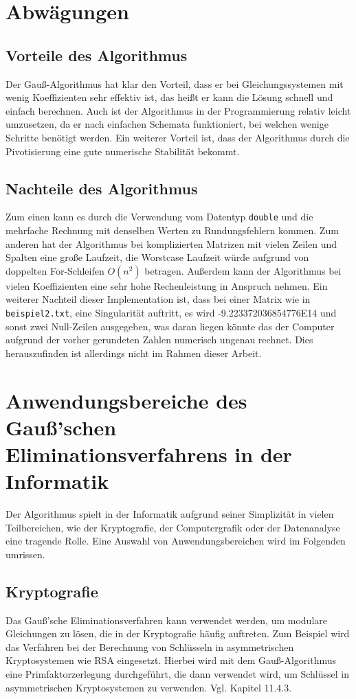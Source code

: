 \documentclass[a4paper, 12pt]{report}
\newcommand{\GA}{Gauß-Algorithmus }
\begin{document}
{\let\clearpage\relax \chapter{Abwägungen}}
\section{Vorteile des Algorithmus}
Der \GA  hat klar den Vorteil, dass er bei Gleichungssystemen mit wenig Koeffizienten
sehr effektiv ist, das heißt er kann die Lösung schnell und einfach berechnen.
Auch ist der Algorithmus in der Programmierung relativ leicht umzusetzen,
da er nach einfachen Schemata funktioniert, bei welchen wenige Schritte benötigt werden.
Ein weiterer Vorteil ist, dass der Algorithmus durch die Pivotisierung eine gute numerische Stabilität bekommt.
\section{Nachteile des Algorithmus}
Zum einen kann es durch die Verwendung vom Datentyp \texttt{double} und die mehrfache Rechnung mit denselben Werten zu Rundungsfehlern kommen.
Zum anderen hat der Algorithmus bei komplizierten Matrizen mit vielen Zeilen und Spalten eine große Laufzeit,
die Worstcase Laufzeit würde aufgrund von doppelten For-Schleifen $ O(n^2) $ betragen.
Außerdem kann der Algorithmus bei vielen Koeffizienten eine
sehr hohe Rechenleistung in Anspruch nehmen.
Ein weiterer Nachteil dieser Implementation ist, dass bei einer Matrix wie in \texttt{beispiel2.txt}, eine Singularität auftritt, es wird -9.223372036854776E14 und sonst zwei
Null-Zeilen ausgegeben, was daran liegen könnte das der Computer aufgrund der vorher gerundeten Zahlen numerisch ungenau rechnet. Dies herauszufinden ist allerdings nicht im Rahmen dieser Arbeit.

{\let\clearpage\relax \chapter{Anwendungsbereiche des Gauß'schen \\ Eliminationsverfahrens in der Informatik}}
Der Algorithmus spielt in der Informatik aufgrund seiner Simplizität in vielen Teilbereichen,
wie der Kryptografie, der Computergrafik oder der Datenanalyse eine tragende Rolle.
Eine Auswahl von Anwendungsbereichen wird im Folgenden umrissen.
\section{Kryptografie}
Das Gauß'sche Eliminationsverfahren kann verwendet werden, um modulare Gleichungen zu lösen,
die in der Kryptografie häufig auftreten.
Zum Beispiel wird das Verfahren bei der Berechnung von Schlüsseln in asymmetrischen Kryptosystemen wie RSA eingesetzt.
Hierbei wird mit dem Gauß-Algorithmus eine Primfaktorzerlegung durchgeführt, die dann
verwendet wird, um Schlüssel in asymmetrischen Kryptosystemen zu verwenden. Vgl. \cite{3} Kapitel 11.4.3.
\end{document}
